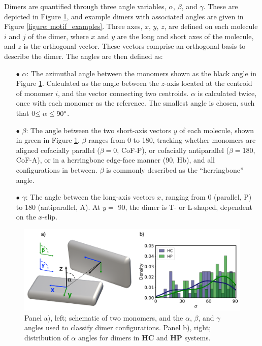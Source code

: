 Dimers are quantified through three angle variables, $\alpha$, $\beta$, and $\gamma$. These are depicted in Figure \ref{figure: dimer_schematic_alpha}, and example dimers with associated angles are given in Figure \ref{figure: motif_examples}. Three axes, $x$, $y$, $z$, are defined on each molecule $i$ and $j$ of the dimer, where $x$ and $y$ are the long and short axes of the molecule, and $z$ is the orthogonal vector. These vectors comprise an orthogonal basis to describe the dimer. The angles are then defined as:
\begin{itemize}
\item[$\bullet$] $\alpha$: The azimuthal angle between the monomers shown as the black angle in Figure \ref{figure: dimer_schematic_alpha}. Calculated as the angle between the $z$-axis located at the centroid of monomer $i$, and the vector connecting two centroids. $\alpha$ is calculated twice, once with each monomer as the reference. The smallest angle is chosen, such that 0\degree{}$\leq\alpha\leq{}90\degree{}$.

\item[$\bullet$] $\beta$: The angle between the two short-axis vectors $y$ of each molecule, shown in green in Figure \ref{figure: dimer_schematic_alpha}. $\beta$ ranges from 0\degree{} to 180\degree{}, tracking whether monomers are aligned cofacially parallel ($\beta=$0\degree{}, CoF-P), or cofacially antiparallel ($\beta=$180\degree{}, CoF-A), or in a herringbone edge-face manner (90\degree{}, Hb), and all configurations in between. $\beta$ is commonly described as the ``herringbone'' angle. 

\item[$\bullet$] $\gamma$: The angle between the long-axis vectors $x$, ranging from 0\degree{} (parallel, P) to 180\degree{} (antiparallel, A). At $y=$ 90\degree{}, the dimer is T- or L-shaped, dependent on the $x$-slip. 
\end{itemize}

\begin{figure}[t]
\centering
  \includegraphics[width=0.8\linewidth]{5ConnectingCrystalStructure/dimer_schematic_alpha}
  \caption[Schematic of $\alpha$, $\beta$, and $\gamma$ angles for classification of dimers.]{Panel a), left; schematic of two monomers, and the $\alpha$, $\beta$, and $\gamma$ angles used to classify dimer configurations. Panel b), right; distribution of $\alpha$ angles for dimers in \textbf{HC} and \textbf{HP} systems.}
  \label{figure: dimer_schematic_alpha}
\end{figure}


